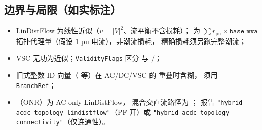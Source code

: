 \documentclass[UTF8,fontset=fandol,a4paper,11pt]{ctexart}
\begin{document}
\subsection{边界与局限（如实标注）}
\begin{itemize}
  \item LinDistFlow 为线性近似（$v=|V|^2$、流平衡不含损耗）； 为
        $\sum r_{\text{pu}}\times\texttt{base\_mva}$ 拓扑代理量（假设 1 pu 电流），非潮流损耗，
        精确损耗须另跑完整潮流；
  \item VSC 无功为近似；\texttt{ValidityFlags} 区分  与
        /；
  \item 旧式整数 ID 向量（ 等）在 AC/DC/VSC 的  重叠时含糊，
        须用 \texttt{BranchRef}；
  \item {}（ONR）为 AC-only LinDistFlow，
        混合交直流路径为 ； 报告
        \texttt{"hybrid-acdc-topology-lindistflow"}（PF 开）或
        \texttt{"hybrid-acdc-topology-connectivity"}（仅连通性）。
\end{itemize}

\end{document}
